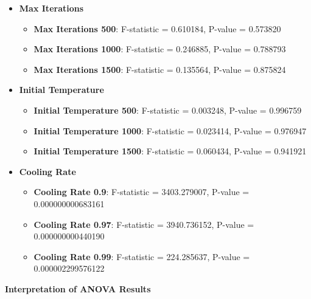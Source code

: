 \documentclass{article}
\begin{document}
    \begin{itemize}
        \item \textbf{Max Iterations}
        \begin{itemize}
            \item \textbf{Max Iterations 500}: F-statistic = 0.610184, P-value = 0.573820
            \item \textbf{Max Iterations 1000}: F-statistic = 0.246885, P-value = 0.788793
            \item \textbf{Max Iterations 1500}: F-statistic = 0.135564, P-value = 0.875824
        \end{itemize}
        \item \textbf{Initial Temperature}
        \begin{itemize}
            \item \textbf{Initial Temperature 500}: F-statistic = 0.003248, P-value = 0.996759
            \item \textbf{Initial Temperature 1000}: F-statistic = 0.023414, P-value = 0.976947
            \item \textbf{Initial Temperature 1500}: F-statistic = 0.060434, P-value = 0.941921
        \end{itemize}
        \item \textbf{Cooling Rate}
        \begin{itemize}
            \item \textbf{Cooling Rate 0.9}: F-statistic = 3403.279007, P-value = 0.000000000683161
            \item \textbf{Cooling Rate 0.97}: F-statistic = 3940.736152, P-value = 0.000000000440190
            \item \textbf{Cooling Rate 0.99}: F-statistic = 224.285637, P-value = 0.000002299576122
        \end{itemize}
    \end{itemize}

    \textbf{Interpretation of ANOVA Results}
\end{document}
